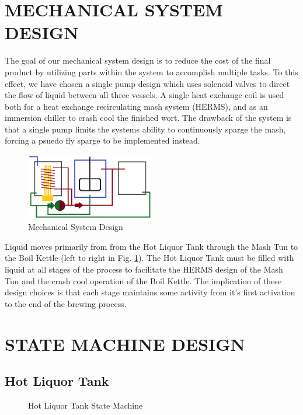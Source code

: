\documentclass[letterpaper, 10 pt, conference]{ieeeconf}  %
\begin{document}
\section{MECHANICAL SYSTEM DESIGN}

The goal of our mechanical system design is to reduce the cost of the final product by utilizing parts within the system to accomplish multiple tasks. To this effect, we have chosen a single pump design which uses solenoid valves to direct the flow of liquid between all three vessels. A single heat exchange coil is used both for a heat exchange recirculating mash system (HERMS), and as an immersion chiller to crash cool the finished wort. The drawback of the system is that a single pump limits the systems ability to continuously sparge the mash, forcing a psuedo fly sparge to be implemented instead.

\begin{figure}[!htb]
  \includegraphics[width=0.5\textwidth]{3vbs}
  \caption{Mechanical System Design}
  \label{mec:diagram}
\end{figure}

Liquid moves primarily from from the Hot Liquor Tank through the Mash Tun to the Boil Kettle (left to right in Fig. \ref{mec:diagram}). The Hot Liquor Tank must be filled with liquid at all stages of the process to facilitate the HERMS design of the Mash Tun and the crash cool operation of the Boil Kettle. The implication of these design choices is that each stage maintains some activity from it's first activation to the end of the brewing process.

\section{STATE MACHINE DESIGN}

\subsection{Hot Liquor Tank} 

\begin{figure}[!htb]
  \centering
  
  \caption{Hot Liquor Tank State Machine}
  \label{sm:hlt}
\end{figure}
\end{document}
